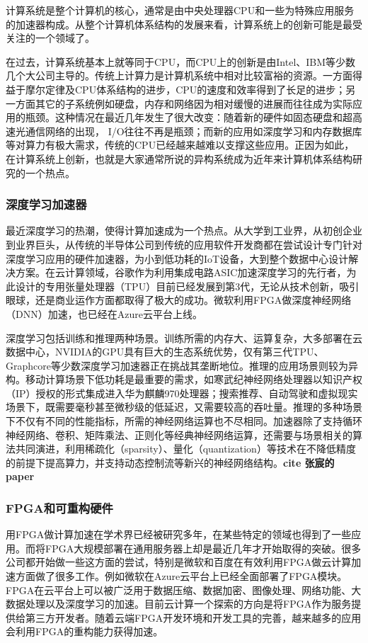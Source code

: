 计算系统是整个计算机的核心，通常是由中央处理器CPU和一些为特殊应用服务的加速器构成。从整个计算机体系结构的发展来看，计算系统上的创新可能是最受关注的一个领域了。

在过去，计算系统基本上就等同于CPU，而CPU上的创新是由Intel、IBM等少数几个大公司主导的。传统上计算力是计算机系统中相对比较富裕的资源。一方面得益于摩尔定律及CPU体系结构的进步，CPU的速度和效率得到了长足的进步；另一方面其它的子系统例如硬盘，内存和网络因为相对缓慢的进展而往往成为实际应用的瓶颈。这种情况在最近几年发生了很大改变：随着新的硬件如固态硬盘和超高速光通信网络的出现， I/O往往不再是瓶颈；而新的应用如深度学习和内存数据库等对算力有极大需求，传统的CPU已经越来越难以支撑这些应用。正因为如此，在计算系统上创新，也就是大家通常所说的异构系统成为近年来计算机体系结构研究的一个热点。

\subsubsection{深度学习加速器}

最近深度学习的热潮，使得计算加速成为一个热点。从大学到工业界，从初创企业到业界巨头，从传统的半导体公司到传统的应用软件开发商都在尝试设计专门针对深度学习应用的硬件加速器，为小到低功耗的IoT设备，大到整个数据中心设计解决方案。在云计算领域，谷歌作为利用集成电路ASIC加速深度学习的先行者，为此设计的专用张量处理器（TPU）目前已经发展到第3代，无论从技术创新，吸引眼球，还是商业运作方面都取得了极大的成功。微软利用FPGA做深度神经网络（DNN）加速，也已经在Azure云平台上线。

深度学习包括训练和推理两种场景。训练所需的内存大、运算复杂，大多部署在云数据中心，NVIDIA的GPU具有巨大的生态系统优势，仅有第三代TPU、Graphcore等少数深度学习加速器正在挑战其垄断地位。推理的应用场景则较为异构。移动计算场景下低功耗是最重要的需求，如寒武纪神经网络处理器以知识产权（IP）授权的形式集成进入华为麒麟970处理器；搜索推荐、自动驾驶和虚拟现实场景下，既需要毫秒甚至微秒级的低延迟，又需要较高的吞吐量。推理的多种场景下不仅有不同的性能指标，所需的神经网络运算也不尽相同。加速器除了支持循环神经网络、卷积、矩阵乘法、正则化等经典神经网络运算，还需要与场景相关的算法共同演进，利用稀疏化（sparsity）、量化（quantization）等技术在不降低精度的前提下提高算力，并支持动态控制流等新兴的神经网络结构。\textbf{cite 张宸的 paper}

\subsubsection{FPGA和可重构硬件}

用FPGA做计算加速在学术界已经被研究多年，在某些特定的领域也得到了一些应用。而将FPGA大规模部署在通用服务器上却是最近几年才开始取得的突破。很多公司都开始做一些这方面的尝试，特别是微软和百度在有效利用FPGA做云计算加速方面做了很多工作。例如微软在Azure云平台上已经全面部署了FPGA模块。FPGA在云平台上可以被广泛用于数据压缩、数据加密、图像处理、网络功能、大数据处理以及深度学习的加速。目前云计算一个探索的方向是将FPGA作为服务提供给第三方开发者。随着云端FPGA开发环境和开发工具的完善，越来越多的应用会利用FPGA的重构能力获得加速。

